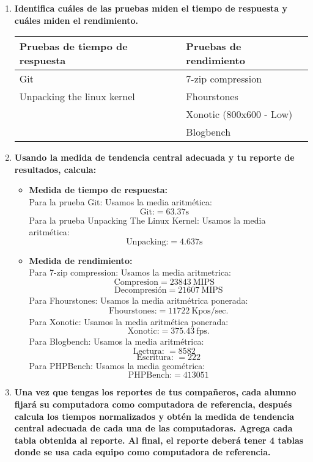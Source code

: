 \documentclass[12pt]{article}
\newcommand{\pl}[1]{\item \textbf{ #1 }}
\begin{document}
\begin{enumerate}[label=(\arabic{section}.\arabic{subsection}.\arabic{enumi})]
    \pl{Identifica cuáles de las pruebas miden el tiempo de respuesta y cuáles miden el rendimiento.}
    \begin{table}[htb]
        \centering
        \begin{tabular}{|p{6cm}|p{6cm}|}
        \hline
        Pruebas de tiempo de respuesta & Pruebas de rendimiento \\
        \hline
        Git & 7-zip compression \\
        \hline
        Unpacking the linux kernel & Fhourstones \\
        \hline
        & Xonotic (800x600 - Low)\\
        \hline
        & Blogbench\\
        \hline
        \end{tabular}
    \end{table}\par

    \pl{Usando la medida de tendencia central adecuada y tu reporte de resultados, calcula:}
    \begin{itemize}
        \item \textbf{Medida de tiempo de respuesta:} \\
       Para la prueba Git: Usamos la media aritmética:
       \[
       \text{Git:} = 63.37 \text{s}\quad
       \]
       Para la prueba Unpacking The Linux Kernel: Usamos la media aritmética:
       \[
       \text{Unpacking:} = 4.637 \text{s}\quad
       \]
       \item \textbf{Medida de rendimiento:} \\
       Para 7-zip compression: Usamos la media aritmetrica:
       \[
       \text{Compresion} = 23843\  \text{MIPS}\quad
       \]
       \[
       \text{Decompresión} = 21607\  \text{MIPS}
       \]
       Para Fhourstones: Usamos la media aritmétrica ponerada:
       \[
       \text{Fhourstones:}= 11722\  \text{Kpos/sec}.
       \]
       Para Xonotic: Usamos la media aritmética ponerada:
       \[
       \text{Xonotic:}=375.43\ \text{fps}.
       \]
       Para Blogbench: Usamos la media aritmétrica:
       \[
       \text{Lectura: } =8582\quad
       \]
       \[
       \text{Escritura: } =222
       \] 
       Para PHPBench: Usamos la media geométrica:
       \[
       \text{PHPBench:} = 413051
       \]
    \end{itemize}

    \pl{Una vez que tengas los reportes de tus compañeros, cada alumno fijará su computadora como computadora de referencia, después calcula los tiempos normalizados y obtén la medida de tendencia central adecuada de cada una de las computadoras. Agrega cada tabla obtenida al reporte. Al final, el reporte deberá tener 4 tablas donde se usa cada equipo como computadora de referencia.}


\end{enumerate}
\end{document}
